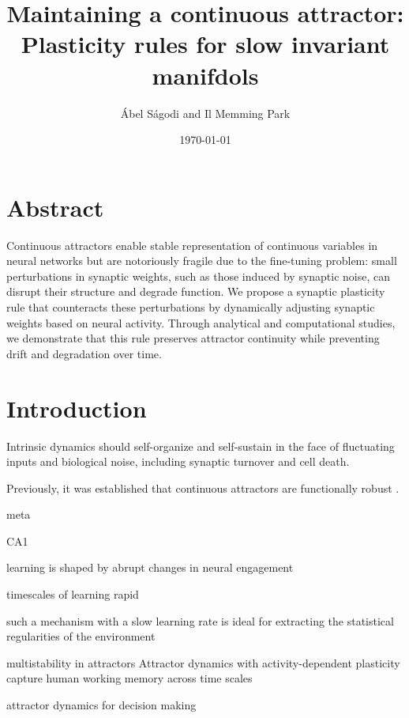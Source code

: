 \documentclass{article}
\title{Maintaining a continuous attractor: Plasticity rules for slow invariant manifdols} %
\author{\'Abel S\'agodi and Il Memming Park}
\date{\today}
\theoremstyle{definition} \newtheorem{definition}{Definition}
\theoremstyle{remark} \newtheorem{remark}{Remark}
\newcounter{ct}
\begin{document}
\maketitle

\section*{Abstract}
Continuous attractors enable stable representation of continuous variables in neural networks but are notoriously fragile due to the fine-tuning problem: small perturbations in synaptic weights, such as those induced by synaptic noise, can disrupt their structure and degrade function.
We propose a synaptic plasticity rule that counteracts these perturbations by dynamically adjusting synaptic weights based on neural activity.
Through analytical and computational studies, we demonstrate that this rule preserves attractor continuity while preventing drift and degradation over time.




\section{Introduction}


Intrinsic dynamics should self-organize and self-sustain in the face of fluctuating inputs and biological noise, including synaptic turnover and cell death.


Previously, it was established that continuous attractors are functionally robust \citep{Sagodi2024a}.


meta \citep{kusmierz2017learning}

CA1 \citep{bittner2017behavioral} 

learning is shaped by abrupt changes in neural engagement \citep{hennig2021learning}

timescales of learning\citep{miller2024timescales}
rapid \citep{li2023rapid} \citep{dan2024neural}
\citep{brennan2023attractor}


\citep{kilpatrick2018wm}

such a mechanism with a slow learning rate is ideal for extracting the statistical regularities of the environment \citep{panichello2019error}

multistability in attractors \citep{braun2010attractors}
Attractor dynamics with activity-dependent plasticity capture human working memory across time scales \citep{brennan2023attractor}

attractor dynamics for decision making \citep{luo2023noncanonical}
\end{document}

